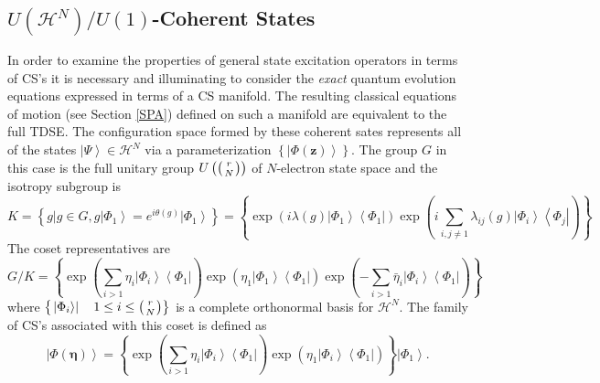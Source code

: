 \documentclass[aps,preprint]{revtex4}%
\begin{document}
\subsection{$U\left(  \mathcal{H}^{N}\right)  /U\left(  1\right)  $-Coherent
States}

In order to examine the properties of general state excitation operators in
terms of CS's it is necessary and illuminating to consider the \emph{exact
}quantum evolution equations expressed in terms of a CS manifold. The
resulting classical equations of motion (see Section \ref{SPA}) defined on
such a manifold are equivalent to the full TDSE. The configuration space
formed by these coherent sates represents all of the states $\left\vert
\Psi\right\rangle \in\mathcal{H}^{N}$ via a parameterization $\left\{
\left\vert \Phi\left(  \mathbf{z}\right)  \right\rangle \right\}  $. The group
$G$ in this case is the full unitary group $U\left(  \left(
\genfrac{}{}{0pt}{}{r}{N}%
\right)  \right)  $ of $N$-electron state space and the isotropy subgroup is
\begin{equation}
K=\left\{  \left.  g\right\vert g\in G,g\left\vert \Phi_{1}\right\rangle
=e^{i\theta\left(  g\right)  }\left\vert \Phi_{1}\right\rangle \right\}
=\left\{  \exp\left(  i\lambda\left(  g\right)  \left\vert \Phi_{1}%
\right\rangle \left\langle \Phi_{1}\right\vert \right)  \exp\left(
i\sum_{i,j\neq1}\lambda_{ij}\left(  g\right)  \left\vert \Phi_{i}\right\rangle
\left\langle \Phi_{j}\right\vert \right)  \right\}
\end{equation}
The coset representatives are
\begin{equation}
G/K=\left\{  \exp\left(  \sum_{i>1}\eta_{i}\left\vert \Phi_{i}\right\rangle
\left\langle \Phi_{1}\right\vert \right)  \exp\left(  \eta_{1}\left\vert
\Phi_{1}\right\rangle \left\langle \Phi_{1}\right\vert \right)  \exp\left(
-\sum_{i>1}\bar{\eta}_{i}\left\vert \Phi_{i}\right\rangle \left\langle
\Phi_{1}\right\vert \right)  \right\}
\end{equation}
where $\left\{  \left.  \left\vert \Phi_{i}\right\rangle \right\vert
\quad1\leq i\leq\left(
\genfrac{}{}{0pt}{}{r}{N}%
\right)  \right\}  $ is a complete orthonormal basis for $\mathcal{H}^{N}$.
The family of CS's associated with this coset is defined as
\begin{equation}
\left\vert \Phi\left(  \mathbf{\eta}\right)  \right\rangle =\left\{
\exp\left(  \sum_{i>1}\eta_{i}\left\vert \Phi_{i}\right\rangle \left\langle
\Phi_{1}\right\vert \right)  \exp\left(  \eta_{1}\left\vert \Phi
_{i}\right\rangle \left\langle \Phi_{1}\right\vert \right)  \right\}
\left\vert \Phi_{1}\right\rangle .
\end{equation}
\end{document}
